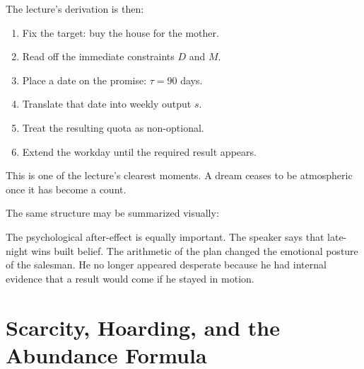 The lecture's derivation is then:
\begin{enumerate}
\item Fix the target: buy the house for the mother.
\item Read off the immediate constraints \(D\) and \(M\).
\item Place a date on the promise: \(\tau=90\) days.
\item Translate that date into weekly output \(s\).
\item Treat the resulting quota as non-optional.
\item Extend the workday until the required result appears.
\end{enumerate}

This is one of the lecture's clearest moments. A dream ceases to be atmospheric once it has become a count.

The same structure may be summarized visually:

\begin{figure}
\centering
{}
\end{figure}

The psychological after-effect is equally important. The speaker says that late-night wins built belief. The arithmetic of the plan changed the emotional posture of the salesman. He no longer appeared desperate because he had internal evidence that a result would come if he stayed in motion.

\section{Scarcity, Hoarding, and the Abundance Formula}

